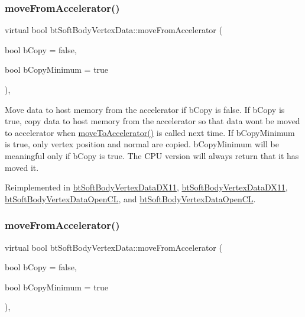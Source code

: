 \subsubsection{\texorpdfstring{move\+From\+Accelerator()}{moveFromAccelerator()}\hspace{0.1cm}{\footnotesize\ttfamily [1/2]}}
{\footnotesize\ttfamily virtual bool bt\+Soft\+Body\+Vertex\+Data\+::move\+From\+Accelerator (\begin{DoxyParamCaption}\item[{bool}]{b\+Copy = {\ttfamily false},  }\item[{bool}]{b\+Copy\+Minimum = {\ttfamily true} }\end{DoxyParamCaption})\hspace{0.3cm}{\ttfamily [inline]}, {\ttfamily [virtual]}}

Move data to host memory from the accelerator if b\+Copy is false. If b\+Copy is true, copy data to host memory from the accelerator so that data won\textquotesingle{}t be moved to accelerator when \hyperlink{classbtSoftBodyVertexData_a2d3f04a5b2461bf95beca6f3fc48e28b}{move\+To\+Accelerator()} is called next time. If b\+Copy\+Minimum is true, only vertex position and normal are copied. b\+Copy\+Minimum will be meaningful only if b\+Copy is true. The C\+PU version will always return that it has moved it. 

Reimplemented in \hyperlink{classbtSoftBodyVertexDataDX11_a32d4193d6e162e0a7a57975ebbab7a16}{bt\+Soft\+Body\+Vertex\+Data\+D\+X11}, \hyperlink{classbtSoftBodyVertexDataDX11_a16599d413d7fc7c96dfb6a335e43079e}{bt\+Soft\+Body\+Vertex\+Data\+D\+X11}, \hyperlink{classbtSoftBodyVertexDataOpenCL_a0ea115bf64323883e19e7bde57a998f1}{bt\+Soft\+Body\+Vertex\+Data\+Open\+CL}, and \hyperlink{classbtSoftBodyVertexDataOpenCL_a89dc6f649bbf848d0af34697fbf1d67b}{bt\+Soft\+Body\+Vertex\+Data\+Open\+CL}.

\mbox{\label{classbtSoftBodyVertexData_aaa8ab4065ecf47a9c3b946b67b6c9f1b}} 
\subsubsection{\texorpdfstring{move\+From\+Accelerator()}{moveFromAccelerator()}\hspace{0.1cm}{\footnotesize\ttfamily [2/2]}}
{\footnotesize\ttfamily virtual bool bt\+Soft\+Body\+Vertex\+Data\+::move\+From\+Accelerator (\begin{DoxyParamCaption}\item[{bool}]{b\+Copy = {\ttfamily false},  }\item[{bool}]{b\+Copy\+Minimum = {\ttfamily true} }\end{DoxyParamCaption})\hspace{0.3cm}{\ttfamily [inline]}, {\ttfamily [virtual]}}

